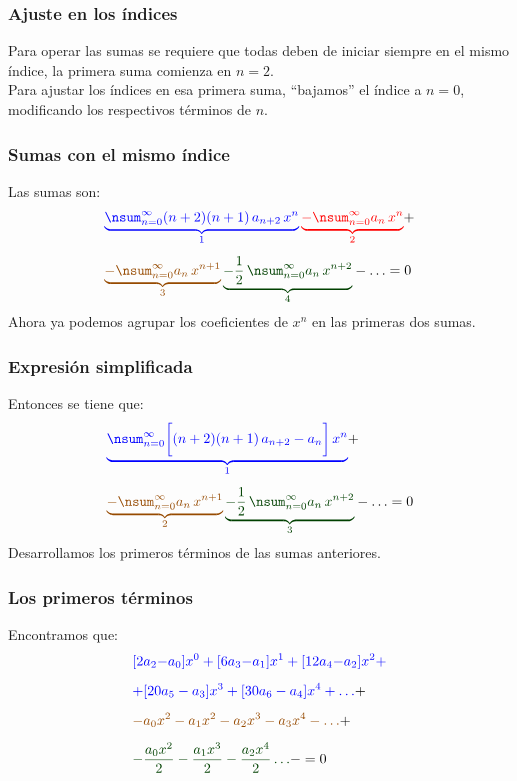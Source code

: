 \documentclass[12pt]{beamer}
\begin{document}
\begin{frame}
\frametitle{Ajuste en los índices}
Para operar las sumas se requiere que todas deben de iniciar siempre en el mismo índice, la primera suma comienza en $n=2$.
\\
\bigskip
\pause
Para ajustar los índices en esa primera suma, \enquote{bajamos} el índice a $n = 0$, modificando los respectivos términos de $n$.
\end{frame}
\begin{frame}
\frametitle{Sumas con el mismo índice}
Las sumas son:
\pause
\begin{align*}
&\textcolor{blue}{\underbrace{\nsum_{n=0}^{\infty} (n + 2)(n +1) \, a_{n+2} \, x^{n}}_{1}} \, \textcolor{red}{\underbrace{- \nsum_{n=0}^{\infty} a_{n} \, x^{n}}_{2}} + \\[0.5em] 
&\textcolor{brown}{\underbrace{- \nsum_{n=0}^{\infty} a_{n} \, x^{n+1}}_{3}} \, \textcolor{OliveGreen}{\underbrace{- \dfrac{1}{2} \, \nsum_{n=0}^{\infty} a_{n} \, x^{n+2}}_{4}} - \ldots = 0
\end{align*} 
\pause
Ahora ya podemos agrupar los coeficientes de $x^{n}$ en las primeras dos sumas.
\end{frame}
\begin{frame}
\frametitle{Expresión simplificada}
Entonces se tiene que:
\pause
\begin{align*}
&\textcolor{blue}{\underbrace{\nsum_{n=0}^{\infty} \bigg[ (n + 2)(n +1) \, a_{n+2}  - a_{n} \bigg] \, x^{n}}_{1}} + \\[0.5em] 
&\textcolor{brown}{\underbrace{- \nsum_{n=0}^{\infty} a_{n} \, x^{n+1}}_{2}} \, \textcolor{OliveGreen}{\underbrace{- \dfrac{1}{2} \, \nsum_{n=0}^{\infty} a_{n} \, x^{n+2}}_{3}} - \ldots = 0
\end{align*} 
\pause
Desarrollamos los primeros términos de las sumas anteriores.
\end{frame}
\begin{frame}
\frametitle{Los primeros términos}
Encontramos que:
\pause
\begin{align*}
&\textcolor{blue}{[2 a_{2} {-} a_{0}] x^{0} + [6 a_{3} {-} a_{1}] x^{1} + [12 a_{4} {-} a_{2}] x^{2} +} \\[0.5em]
&\textcolor{blue}{+ [20 a_{5} - a_{3}] x^{3} + [30 a_{6} - a_{4}] x^{4} + \ldots} + \\[0.5em]
&\textcolor{brown}{- a_{0} x^{2} -a_{1} x^{2} -a_{2} x^{3} -a_{3} x^{4} - \ldots} + \\[0.5em]
&\textcolor{OliveGreen}{-\dfrac{a_{0} x^{2}}{2} - \dfrac{a_{1} x^{3}}{2} - \dfrac{a_{2} x^{4}}{2} \ldots} - = 0 
\end{align*}
\end{frame}
\end{document}

